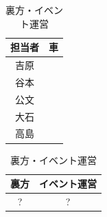 \begin{table}[h]
\begin{minipage}[t]{0.66\columnwidth}
\begin{minipage}[t]{0.49\columnwidth}
    \end{minipage}
    \begin{minipage}[t]{0.49\columnwidth}
      \centering
      \caption{後遣隊}
      \begin{tabular}{cc}
        \hline
        担当者 & 車 \\
        \hline
        吉原 & \\
        谷本 & \\
        公文 & \\
        大石 & \\
        高島 & \\
        \hline
      \end{tabular}
    \end{minipage}

    \centering
    \caption{裏方・イベント運営}
    \begin{tabular}{cc}
      \hline
      裏方 & イベント運営 \\
      \hline
      ? & ? \\
      \hline
    \end{tabular}
  \end{minipage}
\end{table}


